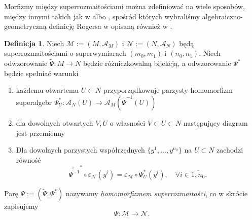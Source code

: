 \documentclass[11pt,a4paper]{report}
\theoremstyle{definition}
\newtheorem{definition}[theorem]{Definicja}
\begin{document}
Morfizmy między superrozmaitościami można zdefiniować na wiele sposobów, między innymi takich jak w \cite{helein} albo \cite{rogers}, spośród których wybraliśmy algebraiczno-geometryczną definicję Rogersa w \cite{rogers} opisaną również w \cite{monterde}.

\begin{definition}
\label{def:supermanifold_homomorphism}
Niech $\mathcal{M} := (M, \mathcal{A}_M)$ i $\mathcal{N} := (N, \mathcal{A}_N)$ będą superrozmaitościami o superwymiarach $(m_0, m_1)$ i $(n_0, n_1)$. Niech odwzorowanie $\widetilde{\Psi}: M \rightarrow N$ będzie różniczkowalną bijekcją, a odwzorowanie $\Psi^*$ będzie spełniać warunki
\begin{enumerate}[(1)]
\item każdemu otwartemu $U \subset N$ przyporządkowuje parzysty homomorfizm superalgebr $\Psi^*_U : \mathcal{A}_N (U) \rightarrow \mathcal{A}_M ( \widetilde{\Psi}^{-1} (U) )$
\item dla dowolnych otwartych $V, U$ o własności $V \subset U \subset N$ następujący diagram jest przemienny
\begin{center}
\end{center}
\item Dla dowolnych parzystych współrzędnych $\{ y^1, \ldots, y^{n_0} \}$ na $U \subset N$ zachodzi równość
\begin{equation}
\label{eq:psi_psistar}
 \widetilde{\Psi^{-1}}^* \circ \varepsilon_\mathcal{N} (y^i) = \varepsilon_\mathcal{M} \circ \Psi_U ^* (y^i), \quad \forall i \in \overline{1, n_0}.
\end{equation}
\end{enumerate}
Parę $\Psi := ( \widetilde{\Psi}, \Psi^* )$ nazywamy \textit{homomorfizmem superrozmaitości}, co w skrócie zapisujemy $$\Psi: \mathcal{M} \rightarrow \mathcal{N}.$$
\end{definition} 
\end{document}
